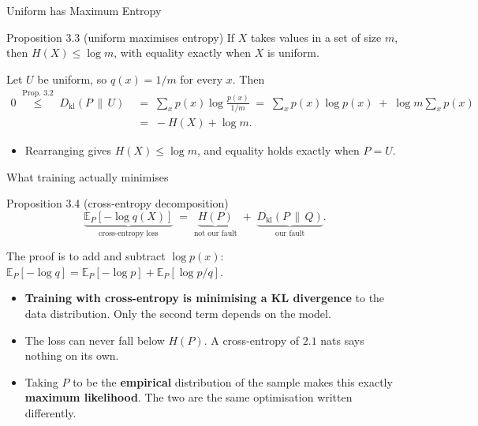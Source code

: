 \documentclass[aspectratio=169,9pt]{beamer}
\newcommand{\orange}[1]{\textcolor{AmazonOrange}{\textbf{#1}}}
\newcommand{\blue}[1]{\textcolor{densityblue}{\textbf{#1}}}
\newcommand{\KL}[2]{D_{\mathrm{kl}}\!\left(#1 \,\|\, #2\right)}
\newcommand{\E}{\mathbb{E}}
\begin{document}
\begin{frame}{Uniform has Maximum Entropy}
\begin{block}{Proposition 3.3 (uniform maximises entropy)}
If $X$ takes values in a set of size $m$, then $H(X) \le \log m$, with equality exactly when $X$ is uniform.
\end{block}
\pause
\vspace{0.1cm}
Let $U$ be uniform, so $q(x) = 1/m$ for every $x$. Then
\vspace{-0.1cm}
\begin{align*}
    0 \;\overset{\text{Prop. }3.2}{\le}\; \KL{P}{U}
      &\;=\; \sum_x p(x)\log\frac{p(x)}{1/m}
       \;=\; \sum_x p(x)\log p(x) \;+\; \log m \sum_x p(x) \\
      &\;=\; -H(X) + \log m .
\end{align*}
\pause
\vspace{-0.1cm}
\begin{itemize}
    \item Rearranging gives $H(X) \le \log m$, and equality holds exactly when $P = U$.
\end{itemize}
\end{frame}

\begin{frame}{What training actually minimises}
\begin{block}{Proposition 3.4 (cross-entropy decomposition)}
\[
    \underbrace{\E_P[-\log q(X)]}_{\text{cross-entropy loss}}
    \;=\; \underbrace{H(P)}_{\text{not our fault}}
    \;+\; \underbrace{\KL{P}{Q}}_{\text{our fault}} .
\]
\end{block}
\pause
\vspace{0.05cm}
The proof is to add and subtract $\log p(x)$:
$\E_P[-\log q] = \E_P[-\log p] + \E_P[\log p/q]$.
\pause
\vspace{0.15cm}
\begin{itemize}
    \item \orange{Training with cross-entropy is minimising a KL divergence} to the data distribution. Only the
    second term depends on the model.
    \pause
    \item The loss can never fall below $H(P)$. A cross-entropy of $2.1$ nats says nothing on its own.
    \pause
    \item Taking $P$ to be the \blue{empirical} distribution of the sample makes this exactly
    \orange{maximum likelihood}. The two are the same optimisation written differently.
\end{itemize}
\end{frame}
\end{document}
